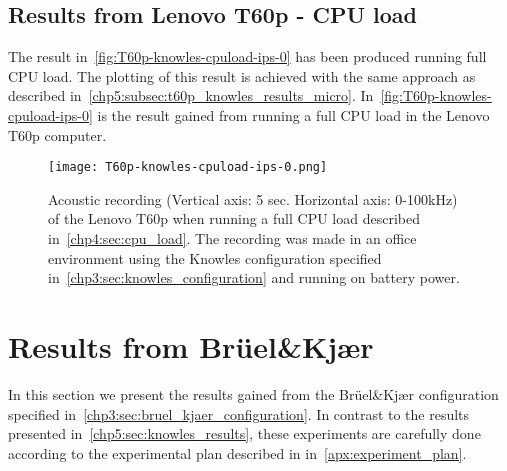 \subsection{Results from Lenovo T60p - CPU load}\label{chp5:subsec:t60p_knowles_results_cpuload}
The result in~\autoref{fig:T60p-knowles-cpuload-ips-0} has been produced running full CPU load. The plotting of this result is achieved with the same approach as described in~\autoref{chp5:subsec:t60p_knowles_results_micro}. 
In~\autoref{fig:T60p-knowles-cpuload-ips-0} is the result gained from running a full CPU load in the Lenovo T60p computer. 
\begin{figure}[ht]
    \centering
    \texttt{[image: T60p-knowles-cpuload-ips-0.png]}
    \caption{Acoustic recording (Vertical axis: 5 sec. Horizontal axis: 0-100kHz) of the Lenovo T60p when running a full CPU load described in~\autoref{chp4:sec:cpu_load}. The recording was made in an office environment using the Knowles configuration specified in~\autoref{chp3:sec:knowles_configuration} and running on battery power. }
    \label{fig:T60p-knowles-cpuload-ips-0}
\end{figure}

\section{Results from Brüel\&Kjær}\label{chp5:sec:bk_results}
In this section we present the results gained from the Brüel\&Kjær configuration specified in~\autoref{chp3:sec:bruel_kjaer_configuration}. 
In contrast to the results presented in~\autoref{chp5:sec:knowles_results}, these experiments are carefully done according to the experimental plan described in in~\autoref{apx:experiment_plan}. 

